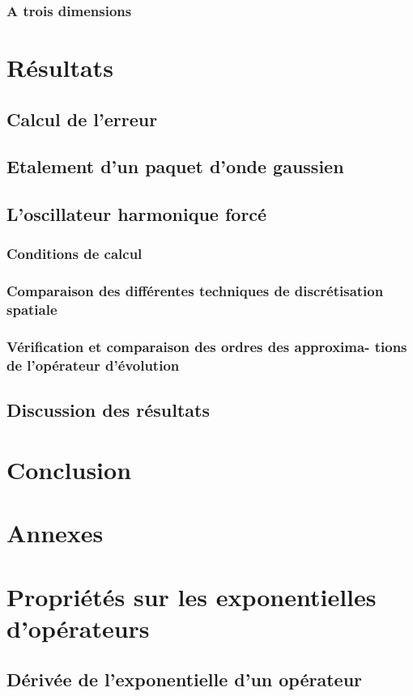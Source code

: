 \documentclass[a4paper, 12pt]{report}
\begin{document}
\subsection{A trois dimensions}
\chapter{Résultats}
\section{Calcul de l’erreur}
\section{Etalement d’un paquet d’onde gaussien}
\section{L’oscillateur harmonique forcé}
\subsection{Conditions de calcul}
\subsection{Comparaison des différentes techniques de discrétisation
spatiale}
\subsection{Vérification et comparaison des ordres des approxima-
tions de l’opérateur d’évolution}
\section{Discussion des résultats}
\chapter*{Conclusion}
\chapter*{Annexes}
\appendix
\chapter{Propriétés sur les exponentielles d’opérateurs}
\section{Dérivée de l’exponentielle d’un opérateur}
\end{document}
